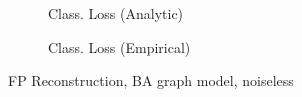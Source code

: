 \begin{figure}
\begin{subfigure}[T]{0.5\columnwidth}
    \caption{Class. Loss (Analytic)}
    \label{subsubfig:BA_noiseless_sgc_feat_prop_class_anal}
    \end{subfigure}%
    \begin{subfigure}[T]{0.5\columnwidth}
    \caption{Class. Loss (Empirical)}%
    \label{subsubfig:BA_noiseless_sgc_feat_prop_class_emp}
    \end{subfigure}%
    \caption{FP Reconstruction, BA graph model, noiseless}
    \vspace{-0.19cm}
\label{subfig:BA_noiseless_sgc_feat_prop}
\end{figure}

